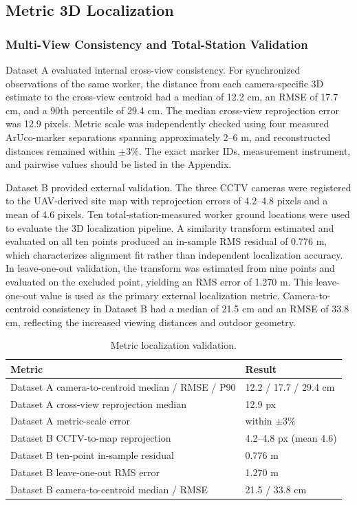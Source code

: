 \subsection{Metric 3D Localization}
\subsubsection{Multi-View Consistency and Total-Station Validation}
Dataset A evaluated internal cross-view consistency. For synchronized observations of the same worker, the distance from each camera-specific 3D estimate to the cross-view centroid had a median of 12.2 cm, an RMSE of 17.7 cm, and a 90th percentile of 29.4 cm. The median cross-view reprojection error was 12.9 pixels. Metric scale was independently checked using four measured ArUco-marker separations spanning approximately 2--6 m, and reconstructed distances remained within \(\pm3\%\). The exact marker IDs, measurement instrument, and pairwise values should be listed in the Appendix.

Dataset B provided external validation. The three CCTV cameras were registered to the UAV-derived site map with reprojection errors of 4.2--4.8 pixels and a mean of 4.6 pixels. Ten total-station-measured worker ground locations were used to evaluate the 3D localization pipeline. A similarity transform estimated and evaluated on all ten points produced an in-sample RMS residual of 0.776 m, which characterizes alignment fit rather than independent localization accuracy. In leave-one-out validation, the transform was estimated from nine points and evaluated on the excluded point, yielding an RMS error of 1.270 m. This leave-one-out value is used as the primary external localization metric. Camera-to-centroid consistency in Dataset B had a median of 21.5 cm and an RMSE of 33.8 cm, reflecting the increased viewing distances and outdoor geometry.

\begin{table}[t]
\centering
\caption{Metric localization validation.}
\label{tab:localization}
\begin{tabular}{p{4.4cm}p{2.4cm}}
\toprule
Metric & Result \\
\midrule
Dataset A camera-to-centroid median / RMSE / P90 & 12.2 / 17.7 / 29.4 cm \\
Dataset A cross-view reprojection median & 12.9 px \\
Dataset A metric-scale error & within \(\pm3\%\) \\
Dataset B CCTV-to-map reprojection & 4.2--4.8 px (mean 4.6) \\
Dataset B ten-point in-sample residual & 0.776 m \\
Dataset B leave-one-out RMS error & 1.270 m \\
Dataset B camera-to-centroid median / RMSE & 21.5 / 33.8 cm \\
\bottomrule
\end{tabular}
\end{table}

